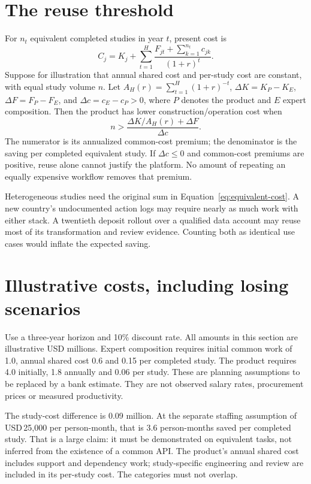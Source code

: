 \section{The reuse threshold}
For $n_t$ equivalent completed studies in year $t$, present cost is
\begin{equation}
 C_j=K_j+\sum_{t=1}^{H}
 \frac{F_{jt}+\sum_{k=1}^{n_t}c_{jk}}{(1+r)^t}.
 \label{eq:equivalent-cost}
\end{equation}
Suppose for illustration that annual shared cost and per-study cost are
constant, with equal study volume $n$. Let
$A_H(r)=\sum_{t=1}^{H}(1+r)^{-t}$,
$\Delta K=K_P-K_E$, $\Delta F=F_P-F_E$, and
$\Delta c=c_E-c_P>0$, where $P$ denotes the product and $E$ expert
composition. Then the product has lower construction/operation cost when
\begin{equation}
 n>\frac{\Delta K/A_H(r)+\Delta F}{\Delta c}.
 \label{eq:reuse-threshold}
\end{equation}
The numerator is its annualized common-cost premium; the denominator is
the saving per completed equivalent study. If $\Delta c\leq0$ and
common-cost premiums are positive, reuse alone cannot justify the platform.
No amount of repeating an equally expensive workflow removes that premium.

Heterogeneous studies need the original sum in
Equation~\eqref{eq:equivalent-cost}. A new country's undocumented action
logs may require nearly as much work with either stack. A twentieth
deposit rollout over a qualified data account may reuse most of its
transformation and review evidence. Counting both as identical use cases
would inflate the expected saving.

\section{Illustrative costs, including losing scenarios}
Use a three-year horizon and 10\% discount rate. All amounts in this section
are illustrative USD millions. Expert composition requires initial common
work of 1.0, annual shared cost 0.6 and 0.15 per completed study.
The product requires 4.0 initially, 1.8 annually and 0.06 per study.
These are planning assumptions to be replaced by a bank estimate. They are
not observed salary rates, procurement prices or measured productivity.

The study-cost difference is 0.09 million. At the separate staffing
assumption of USD\,25,000 per person-month, that is 3.6 person-months
saved per completed study. That is a large claim: it must be demonstrated
on equivalent tasks, not inferred from the existence of a common API.
The product's annual shared cost includes support and dependency work;
study-specific engineering and review are included in its per-study cost.
The categories must not overlap.


